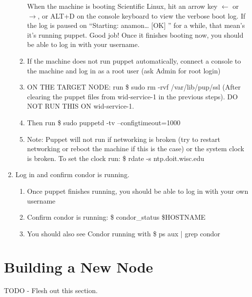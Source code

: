 \documentclass[10pt,letterpaper]{article}
\begin{document}
\begin{enumerate}
\begin{enumerate}
            When the machine is booting Scientific Linux, hit an arrow key
            $\leftarrow$ or $\rightarrow$, or ALT+D on the console keyboard to view the
            verbose boot log. If the log is paused on “{\selectfont Starting:
            anamon…     [OK] }” for a while, that mean’s it’s running puppet. Good
            job! Once it finishes booting now, you should be able to log in with your username.
            \item If the machine does not run puppet automatically, connect a console
            to the machine and log in as a root user (ask Admin for root login)
            \item ON THE TARGET NODE: run {\selectfont \$ sudo rm -rvf /var/lib/pup/ssl }
            (After clearing the puppet files from wid-service-1 in the previous
            steps). DO NOT RUN THIS ON wid-service-1.
            \item Then run {\selectfont \$ sudo puppetd -tv
            --configtimeout=1000 }
            \item Note: Puppet will not run if networking is broken (try to restart
            networking or reboot the machine if this is the case) or the system
            clock is broken. To set the clock run: {\selectfont
            \$ rdate -s ntp.doit.wisc.edu }
        \end{enumerate}
        \item Log in and confirm condor is running.
            \begin{enumerate}
                \item Once puppet finishes running, you should be able to log in
                with your own username
                \item Confirm condor is running: {\selectfont \$
                condor\_status \$HOSTNAME }
                \item You should also see Condor running with {\selectfont
                \$ ps aux | grep condor }
            \end{enumerate}
    \end{enumerate}
\clearpage

\section{Building a New Node}
    TODO - Flesh out this section. \\
\end{document}
